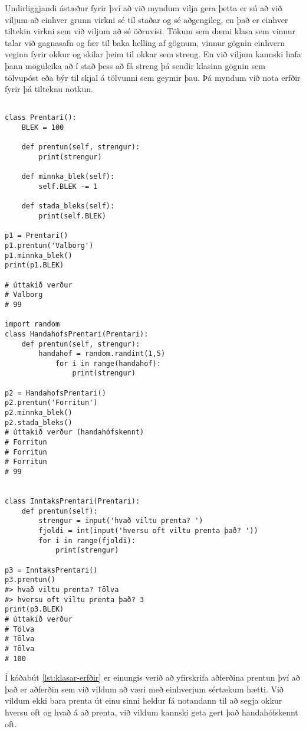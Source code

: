 Undirliggjandi ástæður fyrir því að við myndum vilja gera þetta er sú að við viljum að einhver grunn virkni sé til staðar og sé aðgengileg, en það er einhver tiltekin virkni sem við viljum að sé öðruvísi.
Tökum sem dæmi klasa sem vinnur talar við gagnasafn og fær til baka helling af gögnum, vinnur gögnin einhvern veginn fyrir okkur og skilar þeim til okkar sem streng.
En við viljum kannski hafa þann möguleika að í stað þess að fá streng þá sendir klasinn gögnin sem tölvupóst eða býr til skjal á tölvunni sem geymir þau.
Þá myndum við nota erfðir fyrir þá tilteknu notkun.

\begin{lstlisting}[caption=Erfðir kynntar með klasanum Prentari, label=lst:klasar-erfðir]

class Prentari():
	BLEK = 100
	
	def prentun(self, strengur):
		print(strengur)
	
	def minnka_blek(self):
		self.BLEK -= 1
	
	def stada_bleks(self):
		print(self.BLEK)

p1 = Prentari()
p1.prentun('Valborg')
p1.minnka_blek()
print(p1.BLEK)

# úttakið verður
# Valborg
# 99

import random
class HandahofsPrentari(Prentari):
	def prentun(self, strengur):
		handahof = random.randint(1,5)
			for i in range(handahof):
				print(strengur)

p2 = HandahofsPrentari()
p2.prentun('Forritun')
p2.minnka_blek()
p2.stada_bleks()
# úttakið verður (handahófskennt)
# Forritun
# Forritun
# Forritun
# 99


class InntaksPrentari(Prentari):
	def prentun(self):
		strengur = input('hvað viltu prenta? ')
		fjoldi = int(input('hversu oft viltu prenta það? '))
		for i in range(fjoldi):
			print(strengur)

p3 = InntaksPrentari()
p3.prentun()
#> hvað viltu prenta? Tölva
#> hversu oft viltu prenta það? 3
print(p3.BLEK)
# úttakið verður
# Tölva
# Tölva
# Tölva
# 100
\end{lstlisting}

Í kóðabút \ref{lst:klasar-erfðir} er einungis verið að yfirskrifa aðferðina prentun því að það er aðferðin sem við vildum að væri með einhverjum sértækum hætti.
Við vildum ekki bara prenta út einu sinni heldur fá notandann til að segja okkur hversu oft og hvað á að prenta, við vildum kannski geta gert það handahófskennt oft.